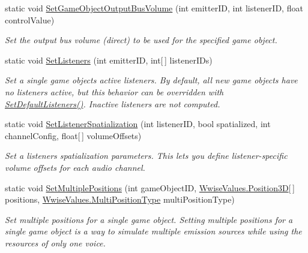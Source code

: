 \begin{DoxyCompactItemize}
static void \mbox{\hyperlink{classak_1_1soundengine_a2a10b5eb429d069b3aa28893ec7777c9}{Set\+Game\+Object\+Output\+Bus\+Volume}} (int emitter\+ID, int listener\+ID, float control\+Value)
\begin{DoxyCompactList}\small\item\em Set the output bus volume (direct) to be used for the specified game object. \end{DoxyCompactList}\item 
static void \mbox{\hyperlink{classak_1_1soundengine_acafe879d3b05a9055d7d1ac87bf36b01}{Set\+Listeners}} (int emitter\+ID, int\mbox{[}$\,$\mbox{]} listener\+I\+Ds)
\begin{DoxyCompactList}\small\item\em Set a single game object\textquotesingle{}s active listeners. By default, all new game objects have no listeners active, but this behavior can be overridden with \mbox{\hyperlink{classak_1_1soundengine_ae46d7ee86793631aa736ecec55614bd6}{Set\+Default\+Listeners()}}. Inactive listeners are not computed. \end{DoxyCompactList}\item 
static void \mbox{\hyperlink{classak_1_1soundengine_a21877b2fa86691ef3457c90eecf9928f}{Set\+Listener\+Spatialization}} (int listener\+ID, bool spatialized, int channel\+Config, float\mbox{[}$\,$\mbox{]} volume\+Offsets)
\begin{DoxyCompactList}\small\item\em Set a listener\textquotesingle{}s spatialization parameters. This lets you define listener-\/specific volume offsets for each audio channel. \end{DoxyCompactList}\item 
static void \mbox{\hyperlink{classak_1_1soundengine_ab41f105de15f1be1822a6541c0a1b8d8}{Set\+Multiple\+Positions}} (int game\+Object\+ID, \mbox{\hyperlink{class_waapi_c_s_1_1_custom_values_1_1_wwise_values_1_1_position3_d}{Wwise\+Values.\+Position3D}}\mbox{[}$\,$\mbox{]} positions, \mbox{\hyperlink{class_waapi_c_s_1_1_custom_values_1_1_wwise_values_a6edfb755afdda63c2168e2528fbf107a}{Wwise\+Values.\+Multi\+Position\+Type}} multi\+Position\+Type)
\begin{DoxyCompactList}\small\item\em Set multiple positions for a single game object. Setting multiple positions for a single game object is a way to simulate multiple emission sources while using the resources of only one voice. \end{DoxyCompactList}\item 

\end{DoxyCompactItemize}
